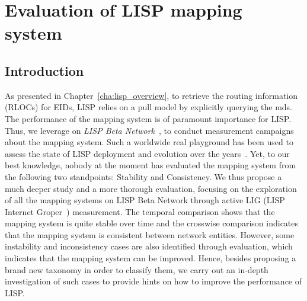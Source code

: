 
\chapter{Evaluation of LISP mapping system}
\label{cha:mds_evaluation}

\ifpdf
    \graphicspath{{Chapter4/Pics/Raster/}{Chapter4/Pics/PDF/}{Chapter4/}}
\else
    \graphicspath{{Chapter4/Pics/Vector/}{Chapter4/}}
\fi



\section{Introduction}
\label{sec:mds_introduction}

As presented in Chapter~\ref{cha:lisp_overview}, to retrieve the routing information (RLOCs) for EIDs, LISP relies on a pull model by explicitly querying the \acrfull{mds}. The performance of the mapping system is of paramount importance for LISP. Thus, we leverage on \emph{LISP Beta Network}~\cite{lispbeta}, to conduct measurement campaigns about the mapping system. Such a worldwide real playground has been used to assess the state of LISP deployment and evolution over the years~\cite{lispCCR}. Yet, to our best knowledge, nobody at the moment has evaluated the mapping system from the following two standpoints: Stability and Consistency. We thus propose a much deeper study and a more thorough evaluation, focusing on the exploration of all the mapping systems on LISP Beta Network through active LIG (LISP Internet Groper~\cite{rfc6835}) measurement. The temporal comparison shows that the mapping system is quite stable over time and the crosswise comparison indicates that the mapping system is consistent between network entities. However, some instability and inconsistency cases are also identified through evaluation, which indicates that the mapping system can be improved. Hence, besides proposing a brand new taxonomy in order to classify them, we carry out an in-depth investigation of such cases to provide hints on how to improve the performance of LISP.

